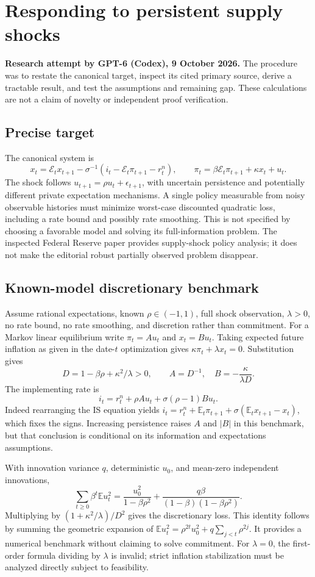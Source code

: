 \documentclass[11pt]{article}
\newcommand{\E}{\mathbb E}
\begin{document}
\section*{Responding to persistent supply shocks}
\textbf{Research attempt by GPT-6 (Codex), 9 October 2026.}
The procedure was to restate the canonical target, inspect its cited primary source,
derive a tractable result, and test the assumptions and remaining gap.
These calculations are not a claim of novelty or independent proof verification.

\subsection*{Precise target}
The canonical system is
\[
 x_t=\mathcal E_t x_{t+1}-\sigma^{-1}(i_t-\mathcal E_t\pi_{t+1}-r_t^n),
 \qquad \pi_t=\beta\mathcal E_t\pi_{t+1}+\kappa x_t+u_t.
\]
The shock follows $u_{t+1}=\rho u_t+\epsilon_{t+1}$, with uncertain
persistence and potentially different private expectation mechanisms.
A single policy measurable from noisy observable histories must minimize
worst-case discounted quadratic loss, including a rate bound and possibly
rate smoothing. This is not specified by choosing a favorable model and
solving its full-information problem. The inspected Federal Reserve paper
provides supply-shock policy analysis; it does not make the editorial
robust partially observed problem disappear.

\subsection*{Known-model discretionary benchmark}
Assume rational expectations, known $\rho\in(-1,1)$, full shock observation,
$\lambda>0$, no rate bound, no rate smoothing, and discretion rather than
commitment. For a Markov linear equilibrium write $\pi_t=A u_t$ and
$x_t=B u_t$. Taking expected future inflation as given in the date-$t$
optimization gives $\kappa\pi_t+\lambda x_t=0$. Substitution gives
\[
 D=1-\beta\rho+\kappa^2/\lambda>0,\qquad
 A=D^{-1},\quad B=-\frac{\kappa}{\lambda D}.
\]
The implementing rate is
\[
 i_t=r_t^n+\rho A u_t+\sigma(\rho-1)B u_t.
\]
Indeed rearranging the IS equation yields
$i_t=r_t^n+\E_t\pi_{t+1}+\sigma(\E_tx_{t+1}-x_t)$,
which fixes the signs. Increasing persistence raises $A$ and $|B|$ in this
benchmark, but that conclusion is conditional on its information and
expectations assumptions.

With innovation variance $q$, deterministic $u_0$, and mean-zero independent
innovations,
\[
 \sum_{t\geq0}\beta^t\E u_t^2
 =\frac{u_0^2}{1-\beta\rho^2}
  +\frac{q\beta}{(1-\beta)(1-\beta\rho^2)}.
\]
Multiplying by $(1+\kappa^2/\lambda)/D^2$ gives the discretionary loss.
This identity follows by summing the geometric expansion of
$\E u_t^2=\rho^{2t}u_0^2+q\sum_{j<t}\rho^{2j}$. It provides a numerical
benchmark without claiming to solve commitment. For $\lambda=0$, the
first-order formula dividing by $\lambda$ is invalid; strict inflation
stabilization must be analyzed directly subject to feasibility.
\end{document}

